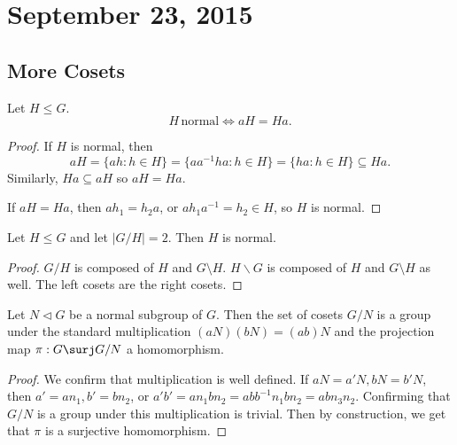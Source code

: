 \section{September 23, 2015}

\subsection{More Cosets}

\begin{prop}
Let $H \leq G$.
\[ H\,\textrm{normal} \iff aH = Ha. \]
\end{prop}

\begin{proof}
If $H$ is normal, then
\[ aH = \lbrace ah : h \in H \rbrace = \lbrace aa^{-1}ha : h \in H
\rbrace = \lbrace ha : h \in H \rbrace \subseteq Ha. \]
Similarly, $Ha \subseteq aH$ so $aH = Ha$.

If $aH = Ha$, then $ah_1 = h_2a$, or $ah_1a^{-1} = h_2 \in H$, so $H$ is
normal.
\end{proof}

\begin{cor}
Let $H \leq G$ and let $\lvert G / H \rvert = 2$. Then $H$ is normal.
\end{cor}

\begin{proof}
$G/H$ is composed of $H$ and $G \setminus H$. $H \backslash G$ is
composed of $H$ and $G \setminus H$ as well. The left cosets are the
right cosets.
\end{proof}

\begin{thm}
Let $N \lhd G$ be a normal subgroup of $G$. Then the set of cosets $G /
N$ is a group under the standard multiplication $(aN)(bN) = (ab)N$ and
the projection map $\pi : G \surj G / N$ a homomorphism.
\end{thm}

\begin{proof}
We confirm that multiplication is well defined. If $aN = a'N, bN = b'N$,
then $a' = an_1, b' = bn_2$, or $a'b' = an_1bn_2 = abb^{-1}n_1bn_2 =
abn_3n_2$. Confirming that $G/N$ is a group under this multiplication is
trivial. Then by construction, we get that $\pi$ is a surjective
homomorphism.
\end{proof}

